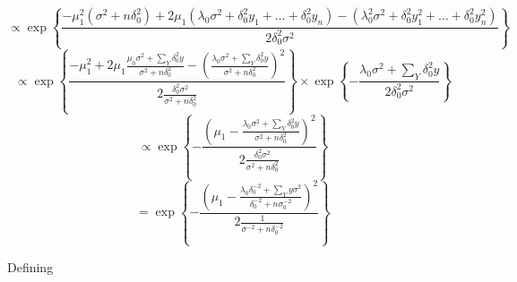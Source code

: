 \documentclass[12pt,a4paper,leqno]{report}
\theoremstyle{plain}
\theoremstyle{definition}
\theoremstyle{remark}
\begin{document}
\begin{def}\label{}
    \begin{equation}\label{}
        \propto
        \exp{
            \left \{
            \frac{
                -\mu_1^2 (\sigma^2 + n\delta_0^2)
                + 2 \mu_1 (\lambda_0 \sigma^2 + \delta_0^2 y_1 + \ldots + \delta_0^2 y_n)
                - (\lambda_0^2 \sigma^2 + \delta_0^2 y_1^2 + \ldots + \delta_0^2 y_n^2)
            }
            {2\delta_0^2 \sigma^2}
            \right \}
        }
    \end{equation}
    \begin{equation}\label{}
        \propto
        \exp{
            \left \{
            \frac{
                - \mu_1^2
                + 2 \mu_1 \frac{\mu_0 \sigma^2 + \sum_{Y} \delta_0^2 y}
                {\sigma^2 + n \delta_0^2}
                - \left(
                \frac{
                    \lambda_0 \sigma^2 + \sum_{Y} \delta_0^2 y
                }
                {\sigma^2 + n \delta_0^2}
                \right)^2
            }
            {
                2 \frac{\delta_0^2 \sigma^2}{\sigma^2 + n\delta_0^2}
            }
            \right \}
        }
        \times
        \exp{
            \left \{
            -\frac{
                \lambda_0 \sigma^2 + \sum_{Y} \delta_0^2 y
            }
            {
                2 \delta_0^2 \sigma^2
            }
            \right \}
        }
    \end{equation}
    \begin{equation}
        \propto
        \exp{
            \left \{
            -
            \frac{
                \left(
                \mu_1
                -
                \frac{
                    \lambda_0 \sigma^2 + \sum_{Y} \delta_0^2 y
                }
                {
                    \sigma^2 + n \delta_0^2
                }
                \right)^2
            }
            {
                2 \frac{
                    \delta_0^2 \sigma^2
                }
                {\sigma^2 + n \delta_0^2}
            }
            \right \}
        }
    \end{equation}
    \begin{equation}
        =
        \exp{
            \left \{
            -
            \frac{
                \left(
                \mu_1
                -
                \frac{
                    \lambda_0 \delta_0^{-2} + \sum_{Y} y \sigma^2
                }
                {
                    \delta_0^{-2} + n \sigma_0^{-2}
                }
                \right)^2
            }
            {
                2 \frac{1}
                {
                    \sigma^{-2} + n \delta_0^{-2}
                }
            }
            \right \}
        }
    \end{equation}
\end{def}Defining
\end{document}
